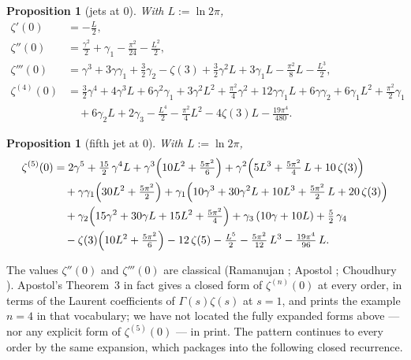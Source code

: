 \documentclass[11pt]{article}
\newtheorem{proposition}[theorem]{Proposition}
\theoremstyle{remark}
\newcommand{\lntwopi}{\ln 2\pi}
\begin{document}
\begin{proposition}[jets at $0$]\label{prop:jets0}
With $L:=\lntwopi$,
\begin{align*}
\zeta'(0)&=-\tfrac{L}{2},\\
\zeta''(0)&=\tfrac{\gamma^2}{2}+\gamma_1-\tfrac{\pi^2}{24}-\tfrac{L^2}{2},\\
\zeta'''(0)&=\gamma^3+3\gamma\gamma_1+\tfrac32\gamma_2-\zeta(3)
+\tfrac32\gamma^2L+3\gamma_1L-\tfrac{\pi^2}{8}L-\tfrac{L^3}{2},\\
\zeta^{(4)}(0)&=\tfrac32\gamma^4+4\gamma^3L+6\gamma^2\gamma_1+3\gamma^2L^2
+\tfrac{\pi^2}{4}\gamma^2+12\gamma\gamma_1L+6\gamma\gamma_2
+6\gamma_1L^2+\tfrac{\pi^2}{2}\gamma_1\\
&\quad+6\gamma_2L+2\gamma_3
-\tfrac{L^4}{2}-\tfrac{\pi^2}{4}L^2-4\zeta(3)L-\tfrac{19\pi^4}{480}.
\end{align*}
\end{proposition}

\begin{proposition}[fifth jet at $0$]\label{prop:jets0def}
With $L:=\lntwopi$,
\begin{align*}
\zeta^{(5)}(0)
&=2\gamma^5+\tfrac{15}{2}\,\gamma^4L
+\gamma^3\Bigl(10L^2+\tfrac{5\pi^2}{6}\Bigr)
+\gamma^2\Bigl(5L^3+\tfrac{5\pi^2}{4}\,L+10\,\zeta(3)\Bigr)\\
&\quad+\gamma\gamma_1\Bigl(30L^2+\tfrac{5\pi^2}{2}\Bigr)
+\gamma_1\Bigl(10\gamma^3+30\gamma^2L+10L^3+\tfrac{5\pi^2}{2}\,L+20\,\zeta(3)\Bigr)\\
&\quad+\gamma_2\Bigl(15\gamma^2+30\gamma L+15L^2+\tfrac{5\pi^2}{4}\Bigr)
+\gamma_3\,(10\gamma+10L)+\tfrac52\,\gamma_4\\
&\quad-\zeta(3)\Bigl(10L^2+\tfrac{5\pi^2}{6}\Bigr)-12\,\zeta(5)
-\tfrac{L^5}{2}-\tfrac{5\pi^2}{12}\,L^3-\tfrac{19\pi^4}{96}\,L .
\end{align*}
\end{proposition}

The values $\zeta''(0)$ and $\zeta'''(0)$ are classical (Ramanujan
\cite{Berndt}; Apostol \cite{Apostol85}; Choudhury \cite{Choudhury}).
Apostol's Theorem~3 \cite{Apostol85} in fact gives a closed form of
$\zeta^{(n)}(0)$ at every order, in terms of the Laurent coefficients of
$\Gamma(s)\zeta(s)$ at $s=1$, and prints the example $n=4$ in that
vocabulary; we have not located the fully expanded forms above — nor any
explicit form of $\zeta^{(5)}(0)$ — in print. The pattern continues to
every order by the same expansion, which packages into the following
closed recurrence.
\end{document}

